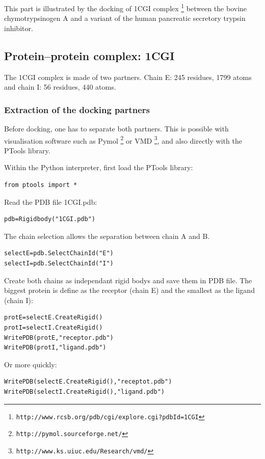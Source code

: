 \documentclass[12pt,a4paper]{article}
\begin{document}
This part is illustrated by the docking of 1CGI complex 
\footnote{\tt http://www.rcsb.org/pdb/cgi/explore.cgi?pdbId=1CGI} between 
the bovine chymotrypsinogen A and a variant of the human pancreatic secretory 
trypsin inhibitor.

\subsection{Protein--protein complex: 1CGI}

The 1CGI complex is made of two partners. Chain E: 245 residues, 1799 atoms and chain I: 56 residues, 440 atoms.

\subsubsection{Extraction of the docking partners}

Before docking, one has to separate both partners. This is possible with visualisation
software such as Pymol \footnote{\tt http://pymol.sourceforge.net/} or VMD \footnote{\tt http://www.ks.uiuc.edu/Research/vmd/}, 
and also directly with the PTools library.

Within the Python interpreter, first load the PTools library:
\begin{verbatim}
from ptools import *
\end{verbatim}

Read the PDB file 1CGI.pdb:
\begin{verbatim}
pdb=Rigidbody("1CGI.pdb")
\end{verbatim}

The chain selection allows the separation between chain A and B.
\begin{verbatim}
selectE=pdb.SelectChainId("E")
selectI=pdb.SelectChainId("I")
\end{verbatim}

Create both chains as independant rigid bodys and save them in PDB file. The biggest 
protein is define as the receptor (chain E) and the smallest as the ligand (chain I):

\begin{verbatim}
protE=selectE.CreateRigid()
protI=selectI.CreateRigid()
WritePDB(protE,"receptor.pdb")
WritePDB(protI,"ligand.pdb")
\end{verbatim}
Or more quickly:
\begin{verbatim}
WritePDB(selectE.CreateRigid(),"receptot.pdb")
WritePDB(selectI.CreateRigid(),"ligand.pdb")
\end{verbatim}
\end{document}
